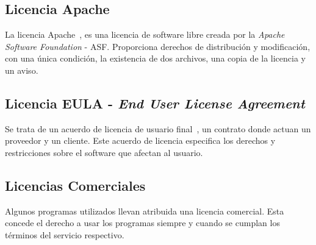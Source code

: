 \subsection{Licencia Apache}
La licencia Apache~\cite{apache_license}, es una licencia de software libre creada por la \textit{Apache Software Foundation} - ASF. Proporciona derechos de distribución y modificación, con una única condición, la existencia de dos archivos, una copia de la licencia y un aviso.

\subsection{Licencia EULA - \textit{End User License Agreement}}
Se trata de un acuerdo de licencia de usuario final~\cite{eula_license}, un contrato donde actuan un proveedor y un cliente. Este acuerdo de licencia especifica los derechos y restricciones sobre el software que afectan al usuario.

\subsection{Licencias Comerciales}
Algunos programas utilizados llevan atribuida una licencia comercial. Esta concede el derecho a usar los programas siempre y cuando se cumplan los términos del servicio respectivo.